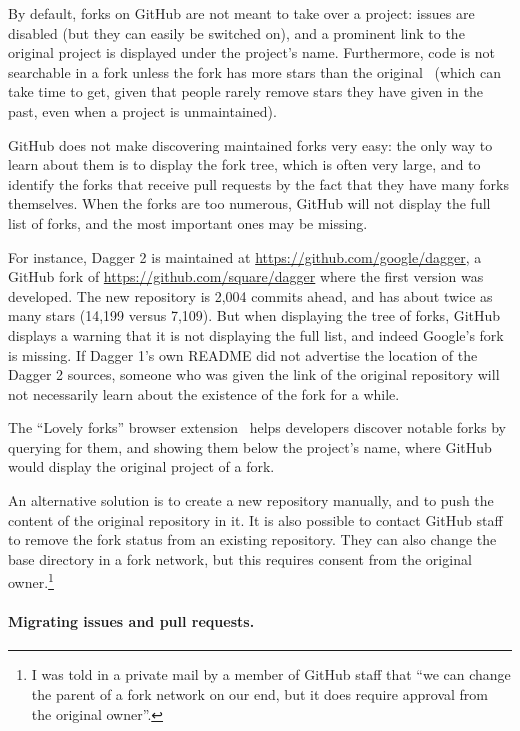 By default, forks on GitHub are not meant to take over a project: issues are disabled (but they can easily be switched on), and a prominent link to the original project is displayed under the project's name.
Furthermore, code is not searchable in a fork unless the fork has more stars than the original~\cite{github_search_forks} (which can take time to get, given that people rarely remove stars they have given in the past, even when a project is unmaintained).

GitHub does not make discovering maintained forks very easy: the only way to learn about them is to display the fork tree, which is often very large, and to identify the forks that receive pull requests by the fact that they have many forks themselves.
When the forks are too numerous, GitHub will not display the full list of forks, and the most important ones may be missing.

For instance, Dagger 2 is maintained at \url{https://github.com/google/dagger}, a GitHub fork of \url{https://github.com/square/dagger} where the first version was developed.
The new repository is 2,004 commits ahead, and has about twice as many stars (14,199 versus 7,109).
But when displaying the tree of forks, GitHub displays a warning that it is not displaying the full list, and indeed Google's fork is missing.
If Dagger 1's own README did not advertise the location of the Dagger 2 sources, someone who was given the link of the original repository will not necessarily learn about the existence of the fork for a while.

The ``Lovely forks'' browser extension~\cite{upadhyay_forks} helps developers discover notable forks by querying for them, and showing them below the project's name, where GitHub would display the original project of a fork.

An alternative solution is to create a new repository manually, and to push the content of the original repository in it.
It is also possible to contact GitHub staff to remove the fork status from an existing repository.
They can also change the base directory in a fork network, but this requires consent from the original owner.\footnote{
	I was told in a private mail by a member of GitHub staff that ``we can change the parent of a fork network on our end, but it does require approval from the original owner''.
}

\paragraph{Migrating issues and pull requests.}

